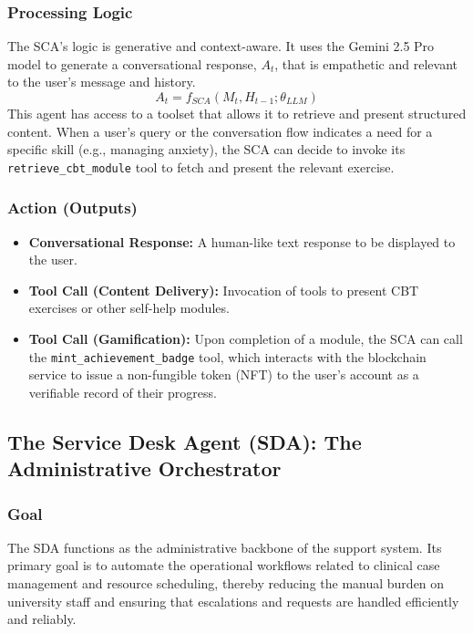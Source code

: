 \subsubsection{Processing Logic}
The SCA's logic is generative and context-aware. It uses the Gemini 2.5 Pro model to generate a conversational response, $A_t$, that is empathetic and relevant to the user's message and history.
$$ A_t = f_{SCA}(M_t, H_{t-1}; \theta_{LLM}) $$
This agent has access to a toolset that allows it to retrieve and present structured content. When a user's query or the conversation flow indicates a need for a specific skill (e.g., managing anxiety), the SCA can decide to invoke its \texttt{retrieve\_cbt\_module} tool to fetch and present the relevant exercise.

\subsubsection{Action (Outputs)}
\begin{itemize}
    \item \textbf{Conversational Response:} A human-like text response to be displayed to the user.
    \item \textbf{Tool Call (Content Delivery):} Invocation of tools to present CBT exercises or other self-help modules.
    \item \textbf{Tool Call (Gamification):} Upon completion of a module, the SCA can call the \texttt{mint\_achievement\_badge} tool, which interacts with the blockchain service to issue a non-fungible token (NFT) to the user's account as a verifiable record of their progress.
\end{itemize}

\subsection{The Service Desk Agent (SDA): The Administrative Orchestrator}

\subsubsection{Goal}
The SDA functions as the administrative backbone of the support system. Its primary goal is to automate the operational workflows related to clinical case management and resource scheduling, thereby reducing the manual burden on university staff and ensuring that escalations and requests are handled efficiently and reliably.

